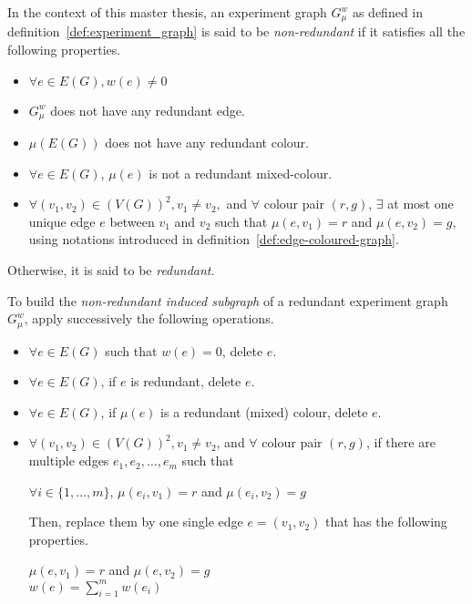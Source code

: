 \begin{definition}    %
    \label{def:redundant-experiment-graph}
    In the context of this master thesis, an experiment graph $G_\mu^w$ as defined in definition~\ref{def:experiment_graph} is said to be \textit{non-redundant} if it satisfies all the following properties.

    \begin{itemize}
        \item $\forall e \in E(G), w(e) \neq 0$
        \item $G_\mu^w$ does not have any redundant edge.
        \item $\mu\left(E(G)\right)$ does not have any redundant colour.
        \item $\forall e \in E(G)$, $\mu(e)$ is not a redundant mixed-colour.
        \item $\forall (v_1, v_2) \in (V(G))^2, v_1 \neq v_2,$ and $\forall$ colour pair $(r, g)$, $\exists$ at most one unique edge $e$ between $v_1$ and $v_2$ such that $\mu(e, v_1) = r$ and $\mu(e, v_2) = g$, using notations introduced in definition~\ref{def:edge-coloured-graph}.
    \end{itemize}

    Otherwise, it is said to be \textit{redundant}.
\end{definition}

To build the \textit{non-redundant induced subgraph} of a redundant experiment graph $G_\mu^w$, apply successively the following operations.

\begin{itemize}
    \item $\forall e \in E(G)$ such that $w(e) = 0$, delete $e$.
    \item $\forall e \in E(G)$, if $e$ is redundant, delete $e$.
    \item $\forall e \in E(G)$, if $\mu(e)$ is a redundant (mixed) colour, delete $e$.
    \item $\forall (v_1, v_2) \in (V(G))^2, v_1 \neq v_2$, and $\forall$ colour pair $(r, g)$, if there are multiple edges $e_1, e_2, \dots, e_m$ such that

        \begin{center}
            $\forall i \in \{1, \dots, m\}$, $\mu(e_i, v_1) = r$ and $\mu(e_i, v_2) = g$
        \end{center}

        Then, replace them by one single edge $e = (v_1, v_2)$ that has the following properties.

        \begin{center}
            $\mu(e, v_1) = r$ and $\mu(e, v_2) = g$ \\
            $w(e) = \sum\limits_{i = 1}^m w(e_i)$
        \end{center}

\end{itemize}

